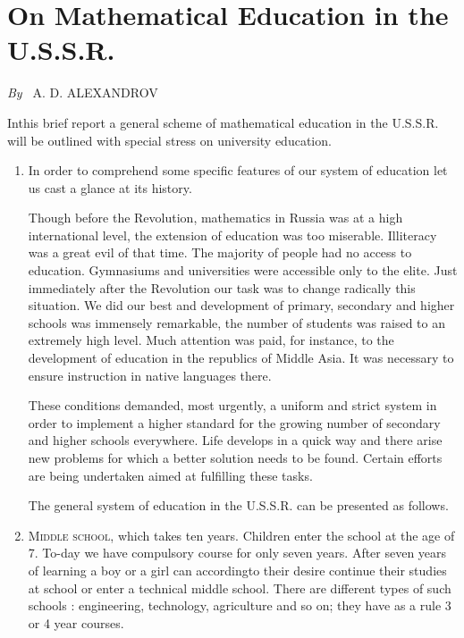 \chapter{On Mathematical Education in the U.S.S.R.}

\begin{center}
{\em By~} A. D. ALEXANDROV
\end{center}

\setcounter{pageoriginal}{98}
In\pageoriginale this brief report a general scheme of mathematical education in the U.S.S.R. will be outlined with special stress on university education.

\begin{enumerate}
\item In order to comprehend some specific features of our system of education let us cast a glance at its history.

Though before the Revolution, mathematics in Russia was at a high international level, the extension of education was too miserable. Illiteracy was a great evil of that time. The majority of people had no access to education. Gymnasiums and universities were accessible only to the elite. Just immediately after the Revolution our task was to change radically this situation. We did our best and development of primary, secondary and higher schools was immensely remarkable, the number of students was raised to an extremely high level. Much attention was paid, for instance, to the development of education in the republics of Middle Asia. It was necessary to ensure instruction in native languages there.

These conditions demanded, most urgently, a uniform and strict system in order to implement a higher standard for the growing number of secondary and higher schools everywhere. Life develops in a quick way and there arise new problems for which a better solution needs to be found. Certain efforts are being undertaken aimed at fulfilling these tasks.

The general system of education in the U.S.S.R. can be presented as follows.

\item \textsc{Middle school}, which takes ten years. Children enter the school at the age of 7. To-day we have compulsory course for only seven years. After seven years of learning a boy or a girl can according\pageoriginale to their desire continue their studies at school or enter a technical middle school. There are different types of such schools : engineering, technology, agriculture and so on; they have as a rule 3 or 4 year courses.


\end{enumerate}
